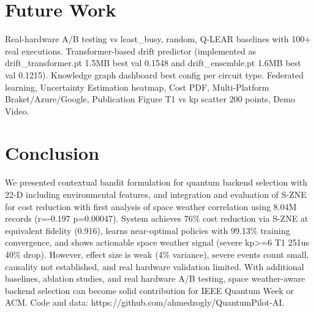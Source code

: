\documentclass[conference]{IEEEtran}
\begin{document}
\section{Future Work}
Real-hardware A/B testing vs least\_busy, random, Q-LEAR baselines with 100+ real executions. Transformer-based drift predictor (implemented as drift\_transformer.pt 1.5MB best val 0.1548 and drift\_ensemble.pt 1.6MB best val 0.1215). Knowledge graph dashboard best config per circuit type. Federated learning, Uncertainty Estimation heatmap, Cost PDF, Multi-Platform Braket/Azure/Google, Publication Figure T1 vs kp scatter 200 points, Demo Video.

\section{Conclusion}
We presented contextual bandit formulation for quantum backend selection with 22-D including environmental features, and integration and evaluation of S-ZNE for cost reduction with first analysis of space weather correlation using 8.04M records (r=-0.197 p=0.00047). System achieves 76\% cost reduction via S-ZNE at equivalent fidelity (0.916), learns near-optimal policies with 99.13\% training convergence, and shows actionable space weather signal (severe kp>=6 T1 251us 40\% drop). However, effect size is weak (4\% variance), severe events count small, causality not established, and real hardware validation limited. With additional baselines, ablation studies, and real hardware A/B testing, space weather-aware backend selection can become solid contribution for IEEE Quantum Week or ACM. Code and data: https://github.com/ahmedzogly/QuantumPilot-AI.
\end{document}
